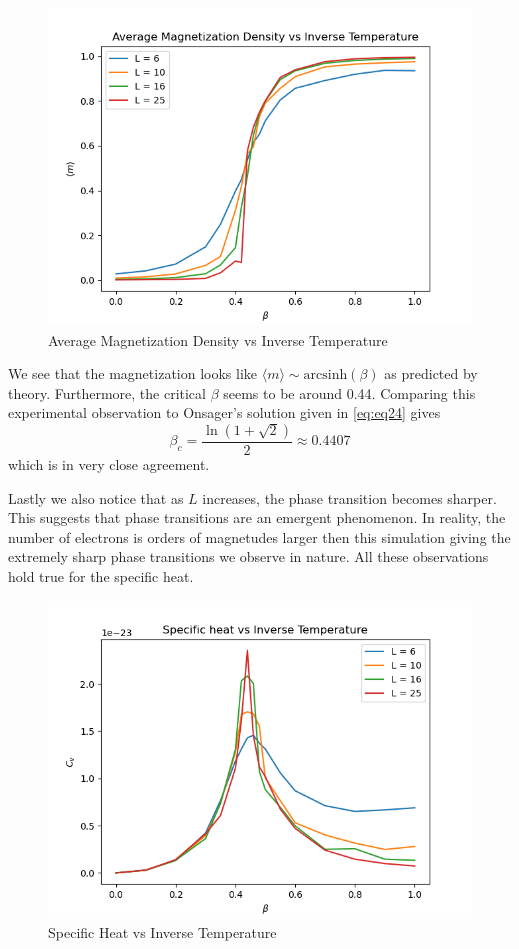 \documentclass{article}
\begin{document}
\begin{figure}[ht]
    \includegraphics[width=\columnwidth]{plots/avg_mag_vs_beta.png}
    \caption{Average Magnetization Density vs Inverse Temperature}
    \label{fig:4}
\end{figure}

We see that the magnetization looks like $\langle m \rangle \sim \mathrm{arcsinh}(\beta)$ as predicted by theory. 
Furthermore, the critical $\beta$ seems to be around 0.44. Comparing this experimental observation to Onsager's solution given 
in \eqref{eq:eq24} gives 
\begin{equation}
    \beta_c = \frac{\ln(1+\sqrt{2})}{2} \approx 0.4407
\end{equation}
which is in very close agreement. 

Lastly we also notice that as $L$ increases, the phase transition becomes sharper. This suggests that phase transitions are
an emergent phenomenon. In reality, the number of electrons is orders of magnetudes larger then this simulation giving the extremely sharp 
phase transitions we observe in nature. All these observations hold true for the specific heat.

\begin{figure}[ht]
    \includegraphics[width=\columnwidth]{plots/specific_heat.png}
    \caption{Specific Heat vs Inverse Temperature}
    \label{fig:6}
\end{figure}
\end{document}
